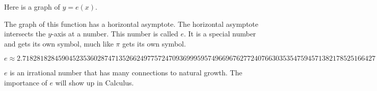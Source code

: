 \documentclass{ximera}
\begin{document}
Here is a graph of $y = e(x)$.


\begin{image}
\end{image}






\begin{center}
\end{center}


The graph of this function has a horizontal asymptote.  The horizontal asymptote intersects the $y$-axis at a number.  This number is called $e$.   It is a special number and gets its own symbol, much like $\pi$ gets its own symbol.



\[
e \approx  2.718281828459045235360287471352662497757247093699959574966967627724076630353547594571382178525166427
\]


$e$ is an irrational number that has many connections to natural growth.  The importance of $e$ will show up in Calculus.
\end{document}
